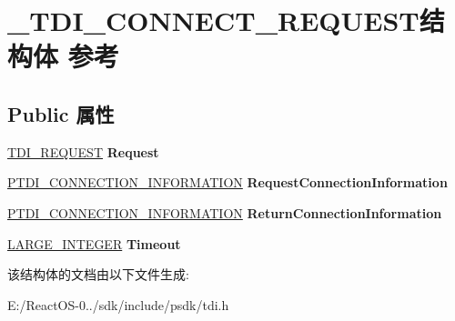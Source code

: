 \hypertarget{struct___t_d_i___c_o_n_n_e_c_t___r_e_q_u_e_s_t}{}\section{\+\_\+\+T\+D\+I\+\_\+\+C\+O\+N\+N\+E\+C\+T\+\_\+\+R\+E\+Q\+U\+E\+S\+T结构体 参考}
\label{struct___t_d_i___c_o_n_n_e_c_t___r_e_q_u_e_s_t}
\subsection*{Public 属性}
\begin{DoxyCompactItemize}
\item 
\mbox{\label{struct___t_d_i___c_o_n_n_e_c_t___r_e_q_u_e_s_t_acfd63a3b4389700193fbfabe13a50b6a}} 
\hyperlink{struct___t_d_i___r_e_q_u_e_s_t}{T\+D\+I\+\_\+\+R\+E\+Q\+U\+E\+ST} {\bfseries Request}
\item 
\mbox{\label{struct___t_d_i___c_o_n_n_e_c_t___r_e_q_u_e_s_t_a77d0938adc21b83f1c40ead87aa66057}} 
\hyperlink{struct___t_d_i___c_o_n_n_e_c_t_i_o_n___i_n_f_o_r_m_a_t_i_o_n}{P\+T\+D\+I\+\_\+\+C\+O\+N\+N\+E\+C\+T\+I\+O\+N\+\_\+\+I\+N\+F\+O\+R\+M\+A\+T\+I\+ON} {\bfseries Request\+Connection\+Information}
\item 
\mbox{\label{struct___t_d_i___c_o_n_n_e_c_t___r_e_q_u_e_s_t_ae13269b25533d1cd7af5ecc9d4a19821}} 
\hyperlink{struct___t_d_i___c_o_n_n_e_c_t_i_o_n___i_n_f_o_r_m_a_t_i_o_n}{P\+T\+D\+I\+\_\+\+C\+O\+N\+N\+E\+C\+T\+I\+O\+N\+\_\+\+I\+N\+F\+O\+R\+M\+A\+T\+I\+ON} {\bfseries Return\+Connection\+Information}
\item 
\mbox{\label{struct___t_d_i___c_o_n_n_e_c_t___r_e_q_u_e_s_t_a03174b4c267d9a899bc41d6a0501b3ae}} 
\hyperlink{union___l_a_r_g_e___i_n_t_e_g_e_r}{L\+A\+R\+G\+E\+\_\+\+I\+N\+T\+E\+G\+ER} {\bfseries Timeout}
\end{DoxyCompactItemize}


该结构体的文档由以下文件生成\+:\begin{DoxyCompactItemize}
\item 
E\+:/\+React\+O\+S-\/0../sdk/include/psdk/tdi.\+h\end{DoxyCompactItemize}
